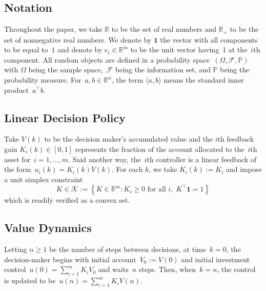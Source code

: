\documentclass[letterpaper, 10 pt, journal, twoside]{IEEEtran}  %
\begin{document}
\subsection{Notation}
    Throughout the paper, we take $\mathbb{R}$ to be the set of real numbers and $\mathbb{R}_{+}$ to be the set of nonnegative real numbers.
    We denote by $\textbf{1}$ the vector with all components to be equal to~$1$ and denote by $ e_i \in \mathbb{R}^m $ to be the unit vector having~1 at the~$i$th component.
    All random objects are defined in a probability space~$(\Omega, \mathcal{F}, \mathbb{P})$ with $\Omega$ being the sample space,~$\mathcal{F}$ being the information set, and $\mathbb{P}$ being the probability measure. 
    For~$a,b \in \mathbb{R}^n$, the term $\langle a, b \rangle$ means the standard inner product~$a^\top b$.



\subsection{Linear Decision Policy}
Take $V(k)$ to be the decision maker's accumulated value and the $i$th feedback gain 
	$
    K_i(k) \in [0, 1]
	$
represents the fraction of the account allocated to the~$i$th asset for~$i=1,\dots,m$. 
Said another way,  the~$i$th controller is  a linear feedback of the form~$
	u_i(k) = K_i(k) V(k).
	$
For each $k$, we take $K_i(k) := K_i$ and impose a unit simplex constraint
	$$
	K \in {\mathcal K} := \left\{K \in \mathbb{R}^{m}: K_i \geq 0 \text{ for all $i$}, \; K^\top \textbf{1} = 1 \right\}
	$$
 which is readily verified as a convex set. 




\subsection{Value Dynamics} 
    Letting $n \geq 1$ be the number of steps between decisions,  at time~{$k=0$}, the decision-maker begins with initial account~$V_0 := V(0)$ and initial investment control~{$
	u(0) = \sum_{i=1}^m K_i V_0
	$}
	and waits~$n$ steps. Then, when~{$k=n$}, the control is updated to be~$
		u(n) = \sum_{i=1}^m K_i V(n).
		$
	
\end{document}
